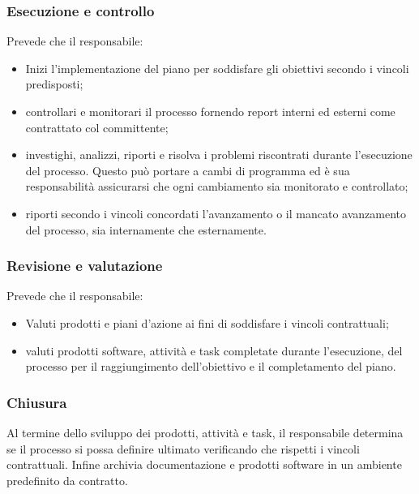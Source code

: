     \subsubsection{Esecuzione e controllo}\label{sec:execution}
        Prevede che il responsabile:
        \begin{itemize}
            \item Inizi l'implementazione del piano per soddisfare gli obiettivi secondo i vincoli predisposti;
            \item controllari e monitorari il processo fornendo report interni ed esterni come contrattato col committente;
            \item investighi, analizzi, riporti e risolva i problemi riscontrati durante l'esecuzione del processo. Questo può portare a cambi di programma ed \`e sua responsabilità assicurarsi che ogni cambiamento sia monitorato e controllato;
            \item riporti secondo i vincoli concordati l'avanzamento o il mancato avanzamento del processo, sia internamente che esternamente.
        \end{itemize}
    \subsubsection{Revisione e valutazione}\label{sec:review}
        Prevede che il responsabile:
        \begin{itemize}
            \item Valuti prodotti e piani d'azione ai fini di soddisfare i vincoli contrattuali;
            \item valuti prodotti software, attivit\`a e task completate durante l'esecuzione, del processo per il raggiungimento dell'obiettivo e il completamento del piano.
        \end{itemize}
    \subsubsection{Chiusura}\label{sec:closure}
        Al termine dello sviluppo dei prodotti, attivit\`a e task, il responsabile determina se il processo si possa definire ultimato verificando che rispetti i vincoli contrattuali. Infine archivia documentazione e prodotti software in un ambiente predefinito da contratto.
        
        